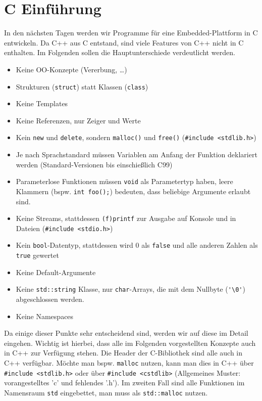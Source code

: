 \section{C Einführung}

In den nächsten Tagen werden wir Programme für eine Embedded-Plattform in C entwickeln.
Da C++ aus C entstand, sind viele Features von C++ nicht in C enthalten. Im Folgenden sollen die Hauptunterschiede verdeutlicht werden.
%
\begin{itemize}
	\item Keine OO-Konzepte (Vererbung, \dots)
    \item Strukturen (\lstinline{struct}) statt Klassen (\lstinline{class})
	\item Keine Templates
	\item Keine Referenzen, nur Zeiger und Werte
	\item Kein \lstinline{new} und \lstinline{delete}, sondern \lstinline{malloc()} und \lstinline{free()} (\lstinline|#include <stdlib.h>|)
	\item Je nach Sprachstandard müssen Variablen am Anfang der Funktion deklariert werden (Standard-Versionen bis einschießlich C99)
	\item Parameterlose Funktionen müssen \lstinline{void} als Parametertyp haben, leere Klammern (bspw. \lstinline{int foo();}) bedeuten, dass beliebige Argumente erlaubt sind.
	\item Keine Streams, stattdessen \lstinline{(f)printf} zur Ausgabe auf Konsole und in Dateien (\verb|#include <stdio.h>|)
	\item Kein \lstinline{bool}-Datentyp, stattdessen wird 0 als \lstinline{false} und alle anderen Zahlen als \lstinline{true} gewertet
	\item Keine Default-Argumente
	\item Keine \lstinline{std::string} Klasse, nur \lstinline{char}-Arrays, die mit dem Nullbyte (\lstinline{'\0'}) abgeschlossen werden.
	\item Keine Namespaces
\end{itemize}
%
Da einige dieser Punkte sehr entscheidend sind, werden wir auf diese im Detail eingehen.
Wichtig ist hierbei, dass alle im Folgenden vorgestellten Konzepte auch in C++ zur Verfügung stehen.
Die Header der C-Bibliothek sind alle auch in C++ verfügbar.
Möchte man bspw. \lstinline{malloc} nutzen, kann man dies in C++ über \lstinline|#include <stdlib.h>| oder über \lstinline{#include <cstdlib>} (Allgemeines Muster: vorangestelltes 'c' und fehlendes '.h').
Im zweiten Fall sind alle Funktionen im Namensraum \lstinline{std} eingebettet, man muss als \lstinline{std::malloc} nutzen.

